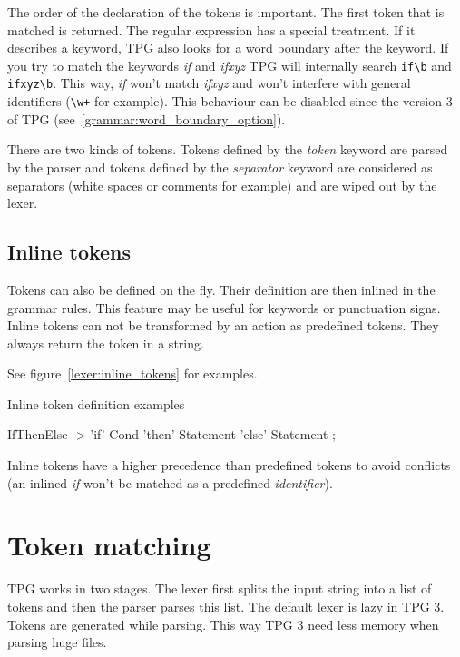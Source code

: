 The order of the declaration of the tokens is important. The first token that is matched is returned. The regular expression has a special treatment. If it describes a keyword, TPG also looks for a word boundary after the keyword. If you try to match the keywords \emph{if} and \emph{ifxyz} TPG will internally search \verb$if\b$ and \verb$ifxyz\b$. This way, \emph{if} won't match \emph{ifxyz} and won't interfere with general identifiers (\verb$\w+$ for example). This behaviour can be disabled since the version 3 of TPG (see~\ref{grammar:word_boundary_option}).

There are two kinds of tokens. Tokens defined by the \emph{token} keyword are parsed by the parser and tokens defined by the \emph{separator} keyword are considered as separators (white spaces or comments for example) and are wiped out by the lexer.

\subsection{Inline tokens}

Tokens can also be defined on the fly. Their definition are then inlined in the grammar rules.
This feature may be useful for keywords or punctuation signs.
Inline tokens can not be transformed by an action as predefined tokens.
They always return the token in a string.

See figure~\ref{lexer:inline_tokens} for examples.

\begin{code}
\caption{Inline token definition examples}                  \label{lexer:inline_tokens}
\begin{verbatimtab}[4]
    IfThenElse ->
        'if' Cond
        'then' Statement
        'else' Statement
        ;
\end{verbatimtab}
\end{code}

Inline tokens have a higher precedence than predefined tokens to avoid conflicts (an inlined \emph{if} won't be matched as a predefined \emph{identifier}).

\section{Token matching}                                    \label{lexer:token_matching}

TPG works in two stages.
The lexer first splits the input string into a list of tokens and then the parser parses this list.
The default lexer is lazy in TPG 3. Tokens are generated while parsing.
This way TPG 3 need less memory when parsing huge files.

